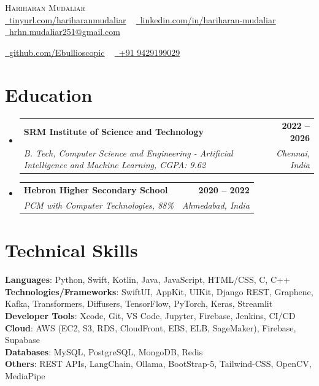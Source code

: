 \documentclass[letterpaper,11pt]{article}
\makeatletter
\newcommand{\resumeSubheading}[4]{
  \vspace{-2pt}\item
    \begin{tabular*}{1.0\textwidth}[t]{l@{\extracolsep{\fill}}r}
      \textbf{#1} & \textbf{\small #2} \\
      \textit{\small#3} & \textit{\small #4} \\
    \end{tabular*}\vspace{-7pt}
}
\newcommand{\resumeSubHeadingListStart}{\begin{itemize}[leftmargin=0.0in, label={}]}
\newcommand{\resumeSubHeadingListEnd}{\end{itemize}}
\makeatother
\begin{document}
\begin{center}
    {\Huge \scshape Hariharan Mudaliar} \\ \vspace{1pt}
    \href{https://tinyurl.com/hariharanmudaliar}{\raisebox{-0.2\height}\faLink\ \underline{tinyurl.com/hariharanmudaliar}} ~
    \href{https://linkedin.com/in/hariharan-mudaliar}{\raisebox{-0.2\height}\faLinkedin\ \underline{linkedin.com/in/hariharan-mudaliar}} ~
    \href{mailto:hrhn.mudaliar251@gmail.com}{\raisebox{-0.2\height}\faEnvelope\ \underline{hrhn.mudaliar251@gmail.com}} ~
    
    \href{https://github.com/Ebullioscopic}{\raisebox{-0.2\height}\faGithub\ \underline{github.com/Ebullioscopic}} ~
    \href{tel:+919429199029}{\raisebox{-0.2\height}\faPhone\ +91 9429199029}
\end{center}

\section{Education}
\resumeSubHeadingListStart
  \resumeSubheading
    {SRM Institute of Science and Technology}{2022 -- 2026}
    {B. Tech, Computer Science and Engineering - Artificial Intelligence and Machine Learning, CGPA: 9.62}{Chennai, India}
\resumeSubHeadingListEnd

\resumeSubHeadingListStart
  \resumeSubheading
    {Hebron Higher Secondary School}{2020 -- 2022}
    {PCM with Computer Technologies, 88\%}{Ahmedabad, India}
\resumeSubHeadingListEnd


\section{Technical Skills}
 \begin{itemize}[leftmargin=0.15in, label={}]
    \small{\item{
     \textbf{Languages}{: Python, Swift, Kotlin, Java, JavaScript, HTML/CSS, C, C++} \\
     \textbf{Technologies/Frameworks}{: SwiftUI, AppKit, UIKit, Django REST, Graphene, Kafka, Transformers, Diffusers, TensorFlow, PyTorch, Keras, Streamlit} \\
     \textbf{Developer Tools}{: Xcode, Git, VS Code, Jupyter, Firebase, Jenkins, CI/CD} \\
     \textbf{Cloud}{: AWS (EC2, S3, RDS, CloudFront, EBS, ELB, SageMaker), Firebase, Supabase} \\
     \textbf{Databases}{: MySQL, PostgreSQL, MongoDB, Redis} \\
     \textbf{Others}{: REST APIs, LangChain, Ollama, BootStrap-5, Tailwind-CSS, OpenCV, MediaPipe} \\
    }}
 \end{itemize}
\end{document}
